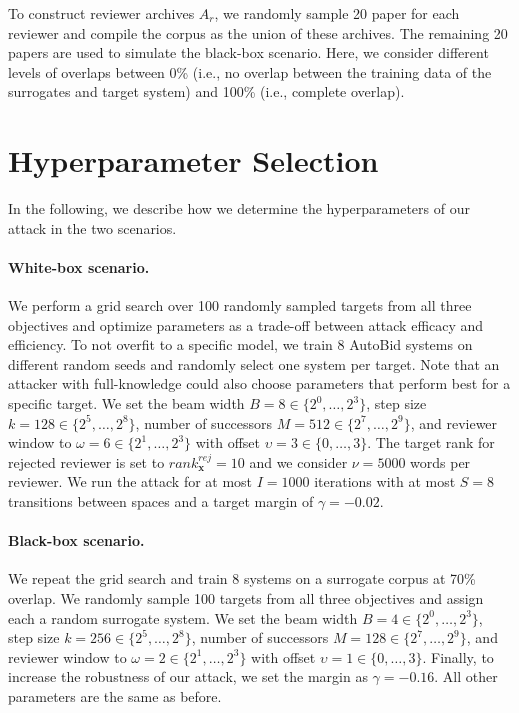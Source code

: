\documentclass[letterpaper,twocolumn,10pt]{article}
\newcommand{\bow}{\textbf{x}}
\newcommand{\submission}{\bow}
\newcommand{\reviewer}{r}
\newcommand{\archive}{A}
\newcommand{\reviewerwindow}{\omega}
\newcommand{\revieweroffset}{\upsilon}
\newcommand{\reviewerwordsmax}{\nu}
\newcommand{\stepsize}{k}
\newcommand{\nosuccessors}{M}
\newcommand{\beamwidth}{B}
\newcommand{\maxitr}{I}
\newcommand{\switches}{S}
\newcommand{\margin}{\gamma}
\begin{document}
To construct reviewer archives $\archive_\reviewer$, we randomly sample 20 paper for each reviewer and compile the corpus as the union of these archives. The remaining 20 papers are used to simulate the black-box scenario. Here, we consider different levels of overlaps between 0\% (i.e., no overlap between the training data of the surrogates and target system) and 100\% (i.e., complete overlap).

\section{Hyperparameter Selection}
\label{app:hyperparameters}
\vspace{-0.5em}
In the following, we describe how we determine the hyperparameters of our attack in the two scenarios.

\paragraph{White-box scenario.}
We perform a grid search over 100 randomly sampled targets from all three objectives and optimize parameters as a trade-off between attack efficacy and efficiency. To not overfit to a specific model, we train 8 AutoBid systems on different random seeds and randomly select one system per target. Note that an attacker with full-knowledge could also choose parameters that perform best for a specific target. We set the beam width $\beamwidth = 8 \in \{2^0, \dots, 2^3\}$, step size $\stepsize = 128 \in \{2^5, \dots, 2^8\}$, number of successors $\nosuccessors = 512 \in \{2^7,\dots, 2^{9}\}$, and reviewer window to $\reviewerwindow = 6 \in \{2^1, \dots, 2^3\}$ with offset $\revieweroffset = 3 \in \{0, \dots, 3\}$. The target rank for rejected reviewer is set to $rank^{rej}_{\submission} = 10$ and we consider $\reviewerwordsmax = 5000$ words per reviewer. We run the attack for at most $\maxitr = 1000$ iterations with at most $\switches = 8$ transitions between spaces and a target margin of $\margin = -0.02$. 

\paragraph{Black-box scenario.}
We repeat the grid search and train 8 systems on a surrogate corpus at 70\% overlap. We randomly sample 100 targets from all three objectives and assign each a random surrogate system. We set the beam width $\beamwidth = 4 \in \{2^0, \dots, 2^3\}$, step size $\stepsize = 256 \in \{2^5, \dots, 2^8\}$, number of successors $\nosuccessors = 128 \in \{2^7,\dots, 2^{9}\}$, and reviewer window to $\reviewerwindow = 2 \in \{2^1, \dots, 2^3\}$ with offset $\revieweroffset = 1 \in \{0, \dots, 3\}$. Finally, to increase the robustness of our attack, we set the margin as $\margin = -0.16$. All other parameters are the same as before.
\end{document}
